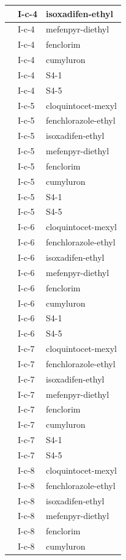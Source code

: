 \documentclass[11pt,a4paper]{article}
\begin{document}
\begin{table}[h]
\begin{tabular}{|l|l|l|}
 & I-c-4 & isoxadifen-ethyl \\ \hline
 & I-c-4 & mefenpyr-diethyl \\ \hline
 & I-c-4 & fenclorim \\ \hline
 & I-c-4 & cumyluron \\ \hline
 & I-c-4 & S4-1 \\ \hline
 & I-c-4 & S4-5 \\ \hline
 & I-c-5 & cloquintocet-mexyl \\ \hline
 & I-c-5 & fenchlorazole-ethyl \\ \hline
 & I-c-5 & isoxadifen-ethyl \\ \hline
 & I-c-5 & mefenpyr-diethyl \\ \hline
 & I-c-5 & fenclorim \\ \hline
 & I-c-5 & cumyluron \\ \hline
 & I-c-5 & S4-1 \\ \hline
 & I-c-5 & S4-5 \\ \hline
 & I-c-6 & cloquintocet-mexyl \\ \hline
 & I-c-6 & fenchlorazole-ethyl \\ \hline
 & I-c-6 & isoxadifen-ethyl \\ \hline
 & I-c-6 & mefenpyr-diethyl \\ \hline
 & I-c-6 & fenclorim \\ \hline
 & I-c-6 & cumyluron \\ \hline
 & I-c-6 & S4-1 \\ \hline
 & I-c-6 & S4-5 \\ \hline
 & I-c-7 & cloquintocet-mexyl \\ \hline
 & I-c-7 & fenchlorazole-ethyl \\ \hline
 & I-c-7 & isoxadifen-ethyl \\ \hline
 & I-c-7 & mefenpyr-diethyl \\ \hline
 & I-c-7 & fenclorim \\ \hline
 & I-c-7 & cumyluron \\ \hline
 & I-c-7 & S4-1 \\ \hline
 & I-c-7 & S4-5 \\ \hline
 & I-c-8 & cloquintocet-mexyl \\ \hline
 & I-c-8 & fenchlorazole-ethyl \\ \hline
 & I-c-8 & isoxadifen-ethyl \\ \hline
 & I-c-8 & mefenpyr-diethyl \\ \hline
 & I-c-8 & fenclorim \\ \hline
 & I-c-8 & cumyluron \\ \hline

\end{tabular}
\end{table}
\end{document}
